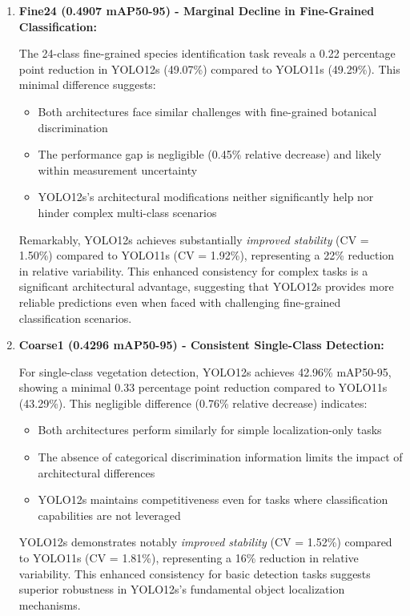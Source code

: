 \begin{enumerate}
    Interestingly, YOLO12s maintains similar variance characteristics (CV = 1.89\%) to YOLO11s (CV = 2.07\%), with actually \textit{improved consistency} despite slightly lower mean performance. This trade-off between peak performance and reliability may be preferable for certain deployment scenarios.
    
    \item \textbf{Fine24 (0.4907 mAP50-95) - Marginal Decline in Fine-Grained Classification:}
    
    The 24-class fine-grained species identification task reveals a 0.22 percentage point reduction in YOLO12s (49.07\%) compared to YOLO11s (49.29\%). This minimal difference suggests:
    
    \begin{itemize}
        \item Both architectures face similar challenges with fine-grained botanical discrimination
        \item The performance gap is negligible (0.45\% relative decrease) and likely within measurement uncertainty
        \item YOLO12s's architectural modifications neither significantly help nor hinder complex multi-class scenarios
    \end{itemize}
    
    Remarkably, YOLO12s achieves substantially \textit{improved stability} (CV = 1.50\%) compared to YOLO11s (CV = 1.92\%), representing a 22\% reduction in relative variability. This enhanced consistency for complex tasks is a significant architectural advantage, suggesting that YOLO12s provides more reliable predictions even when faced with challenging fine-grained classification scenarios.
    
    \item \textbf{Coarse1 (0.4296 mAP50-95) - Consistent Single-Class Detection:}
    
    For single-class vegetation detection, YOLO12s achieves 42.96\% mAP50-95, showing a minimal 0.33 percentage point reduction compared to YOLO11s (43.29\%). This negligible difference (0.76\% relative decrease) indicates:
    
    \begin{itemize}
        \item Both architectures perform similarly for simple localization-only tasks
        \item The absence of categorical discrimination information limits the impact of architectural differences
        \item YOLO12s maintains competitiveness even for tasks where classification capabilities are not leveraged
    \end{itemize}
    
    YOLO12s demonstrates notably \textit{improved stability} (CV = 1.52\%) compared to YOLO11s (CV = 1.81\%), representing a 16\% reduction in relative variability. This enhanced consistency for basic detection tasks suggests superior robustness in YOLO12s's fundamental object localization mechanisms.
\end{enumerate}

